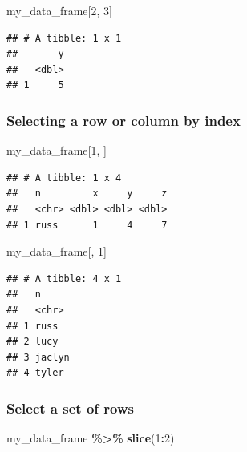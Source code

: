 \documentclass[
  12pt,
]{book}
\newenvironment{Shaded}{\begin{snugshade}}{\end{snugshade}}
\newcommand{\DecValTok}[1]{\textcolor[rgb]{0.00,0.00,0.81}{#1}}
\newcommand{\FunctionTok}[1]{\textcolor[rgb]{0.13,0.29,0.53}{\textbf{#1}}}
\newcommand{\NormalTok}[1]{#1}
\newcommand{\SpecialCharTok}[1]{\textcolor[rgb]{0.81,0.36,0.00}{\textbf{#1}}}
\begin{document}
\begin{Shaded}
\begin{Highlighting}[]
\NormalTok{my\_data\_frame[}\DecValTok{2}\NormalTok{, }\DecValTok{3}\NormalTok{]}
\end{Highlighting}
\end{Shaded}

\begin{verbatim}
## # A tibble: 1 x 1
##       y
##   <dbl>
## 1     5
\end{verbatim}

\hypertarget{selecting-a-row-or-column-by-index}{%
\subsubsection{Selecting a row or column by index}\label{selecting-a-row-or-column-by-index}}

\begin{Shaded}
\begin{Highlighting}[]
\NormalTok{my\_data\_frame[}\DecValTok{1}\NormalTok{, ]}
\end{Highlighting}
\end{Shaded}

\begin{verbatim}
## # A tibble: 1 x 4
##   n         x     y     z
##   <chr> <dbl> <dbl> <dbl>
## 1 russ      1     4     7
\end{verbatim}

\begin{Shaded}
\begin{Highlighting}[]
\NormalTok{my\_data\_frame[, }\DecValTok{1}\NormalTok{]}
\end{Highlighting}
\end{Shaded}

\begin{verbatim}
## # A tibble: 4 x 1
##   n     
##   <chr> 
## 1 russ  
## 2 lucy  
## 3 jaclyn
## 4 tyler
\end{verbatim}

\hypertarget{select-a-set-of-rows}{%
\subsubsection{Select a set of rows}\label{select-a-set-of-rows}}

\begin{Shaded}
\begin{Highlighting}[]
\NormalTok{my\_data\_frame }\SpecialCharTok{\%\textgreater{}\%} 
  \FunctionTok{slice}\NormalTok{(}\DecValTok{1}\SpecialCharTok{:}\DecValTok{2}\NormalTok{) }
\end{Highlighting}
\end{Shaded}
\end{document}
